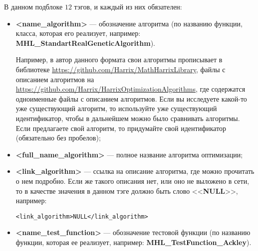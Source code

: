 \documentclass[a4paper,12pt]{article}
\begin{document}
В данном подблоке $ 12 $ тэгов, и каждый из них обязателен:
\begin{itemize}
\item \textbf{<name\_algorithm>} --- обозначение алгоритма (по названию функции, класса, которая его реализует, например: \textbf{MHL\_StandartRealGeneticAlgorithm}). 

Например, в автор данного формата свои алгоритмы прописывает в библиотеке \href {https://github.com/Harrix/MathHarrixLibrary} {https://github.com/Harrix/MathHarrixLibrary}, файлы с описанием алгоритмов на \href {https://github.com/Harrix/HarrixOptimizationAlgorithms} {https://github.com/Harrix/HarrixOptimizationAlgorithms}, где содержатся одноименные файлы с описанием алгоритмов. Если вы исследуете какой-то уже существующий алгоритм, то используйте уже существующий идентификатор, чтобы в дальнейшем можно было сравнивать алгоритмы. Если предлагаете свой алгоритм, то придумайте свой идентификатор (обязательно без пробелов);
\item \textbf{<full\_name\_algorithm>} --- полное название алгоритма оптимизации;
\item \textbf{<link\_algorithm>} --- ссылка на описание алгоритма, где можно прочитать о нем подробно. Если же такого описания нет, или оно не выложено в сети, то в качестве значения в данном тэге должно быть слово <<\textbf{NULL}>>, например:
\begin{lstlisting}[label=Part08,caption=У алгоритма нет ссылки в файле Harrix Optimization Testing]
<link_algorithm>NULL</link_algorithm>
\end{lstlisting}
\item \textbf{<name\_test\_function>} --- обозначение  тестовой функции (по названию функции, которая ее реализует, например: \textbf{MHL\_TestFunction\_Ackley}). 


\end{itemize}
\end{document}
